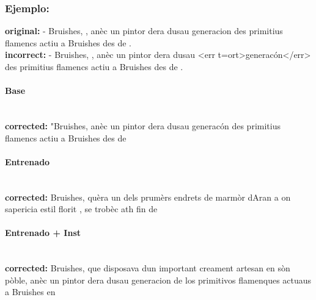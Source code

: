 \subsubsection{Ejemplo:}
\textbf{original:} - Bruishes, , anèc un pintor dera dusau generacion des primitius flamencs actiu a Bruishes des de .\\
\textbf{incorrect:} - Bruishes, , anèc un pintor dera dusau {\textless}err t=ort{\textgreater}generacón{\textless}/err{\textgreater} des primitius flamencs actiu a Bruishes des de .

\paragraph{Base}~\\
\textbf{corrected:} "Bruishes, anèc un pintor dera dusau generacón des primitius flamencs actiu a Bruishes des de

\paragraph{Entrenado}~\\
\textbf{corrected:} Bruishes, qu\textquotesingle{}èra un dels prumèrs endrets de marmòr d\textquotesingle{}Aran a on s\textquotesingle{}apericia estil florit , se trobèc ath fin de

\paragraph{Entrenado + Inst}~\\
\textbf{corrected:} Bruishes, que disposava d\textquotesingle{}un important creament artesan en sòn pòble, anèc un pintor dera dusau generacion de los primitivos flamenques actuaus a Bruishes en